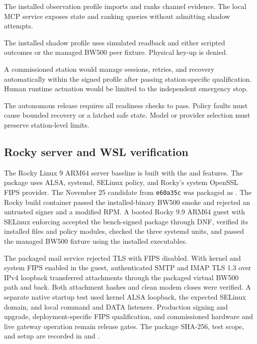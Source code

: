 \documentclass[11pt,a4paper]{article}
\begin{document}
\begin{description}[leftmargin=1.45in,style=nextline]
  \item[Observation] The installed observation profile imports and ranks
    channel evidence. The local MCP service exposes state and ranking
    queries without admitting shadow attempts.
  \item[Shadow qualification] The installed shadow profile uses simulated
    readback and either scripted outcomes or the managed BW500 peer fixture.
    Physical key-up is denied.
  \item[Proposed autonomous operation] A commissioned station would
    manage sessions, retries, and recovery automatically within the signed
    profile after passing station-specific qualification. Human runtime
    actuation would be limited to the independent emergency stop.
\end{description}

The autonomous release requires all readiness checks to pass. Policy faults
must cause bounded recovery or a latched safe state. Model or provider
selection must preserve station-level limits.

\subsection{Rocky server and WSL verification}
\label{sec:rocky-wsl-verification}
The Rocky Linux 9 ARM64 server baseline is built with the
 and  features. The package uses
ALSA, systemd, SELinux policy, and Rocky's system OpenSSL FIPS provider.
The November 25 candidate from \texttt{e60a35c} was packaged as
. The Rocky build
container passed the installed-binary BW500 smoke and rejected an untrusted
signer and a modified RPM. A booted Rocky 9.9 ARM64 guest with SELinux
enforcing accepted the bench-signed package through DNF, verified its
installed files and policy modules, checked the three systemd units, and
passed the managed BW500 fixture using the installed executables.

The packaged mail service rejected TLS with FIPS disabled. With kernel and
system FIPS enabled in the guest, authenticated SMTP and IMAP TLS 1.3 over
IPv4 loopback transferred attachments through the packaged virtual BW500
path and back. Both attachment hashes and clean modem closes were verified.
A separate native startup test used kernel ALSA loopback, the expected SELinux
domain, and local command and DATA listeners. Production signing and upgrade,
deployment-specific FIPS qualification, and commissioned hardware and live
gateway operation remain release gates. The package SHA-256, test scope, and
setup are recorded in 
and .
\end{document}
